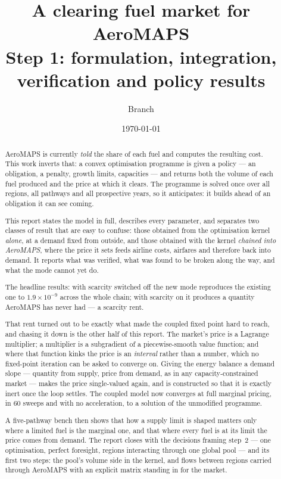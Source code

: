 \documentclass[11pt,a4paper]{article}
\title{\textbf{A clearing fuel market for AeroMAPS}\\[2mm]
\large Step 1: formulation, integration, verification and policy results}
\author{Branch \var{feat/fuel-clearing-step1}}
\date{\today}
\begin{document}
\maketitle

\begin{abstract}
\noindent AeroMAPS is currently \emph{told} the share of each fuel and computes the
resulting cost. This work inverts that: a convex optimisation programme is given a
policy --- an obligation, a penalty, growth limits, capacities --- and returns both the
volume of each fuel produced and the price at which it clears. The programme is solved
once over all regions, all pathways and all prospective years, so it anticipates: it
builds ahead of an obligation it can see coming.

This report states the model in full, describes every parameter, and separates two
classes of result that are easy to confuse: those obtained from the optimisation kernel
\emph{alone}, at a demand fixed from outside, and those obtained with the kernel
\emph{chained into AeroMAPS}, where the price it sets feeds airline costs, airfares and
therefore back into demand. It reports what was verified, what was found to be broken
along the way, and what the mode cannot yet do.

The headline results: with scarcity switched off the new mode reproduces the existing
one to $1.9\times10^{-9}$ across the whole chain; with scarcity on it produces a
quantity AeroMAPS has never had --- a scarcity rent.

That rent turned out to be exactly what made the coupled fixed point hard to reach, and
chasing it down is the other half of this report. The market's price is a Lagrange
multiplier; a multiplier is a subgradient of a piecewise-smooth value function; and where
that function kinks the price is an \emph{interval} rather than a number, which no
fixed-point iteration can be asked to converge on. Giving the energy balance a demand
slope --- quantity from supply, price from demand, as in any capacity-constrained market
--- makes the price single-valued again, and is constructed so that it is exactly inert
once the loop settles. The coupled model now converges at full marginal pricing, in 60
sweeps and with no acceleration, to a solution of the unmodified programme.

A five-pathway bench then shows that how a supply limit is shaped matters only where a
limited fuel is the marginal one, and that where every fuel is at its limit the price comes
from demand. The report closes with the decisions framing step~2 --- one optimisation,
perfect foresight, regions interacting through one global pool --- and its first two steps:
the pool's volume side in the kernel, and flows between regions carried through AeroMAPS
with an explicit matrix standing in for the market.
\end{abstract}
\end{document}

